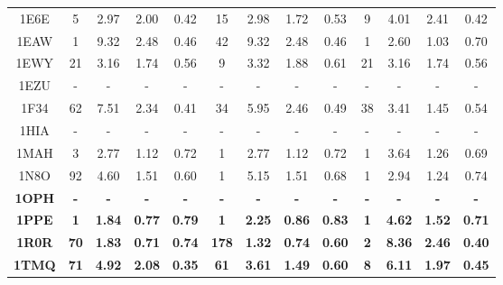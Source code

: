 \begin{longtable}{c c c c c|c c c c|c c c c}
 {\tiny 1E6E} &{\tiny 5}&{\tiny 2.97}&{\tiny 2.00}&{\tiny 0.42} &{\tiny 15}&{\tiny 2.98}&{\tiny 1.72}&{\tiny 0.53} &{\tiny 9}&{\tiny 4.01}&{\tiny 2.41}&{\tiny 0.42}\\ 
 {\tiny 1EAW} &{\tiny 1}&{\tiny 9.32}&{\tiny 2.48}&{\tiny 0.46} &{\tiny 42}&{\tiny 9.32}&{\tiny 2.48}&{\tiny 0.46} &{\tiny 1}&{\tiny 2.60}&{\tiny 1.03}&{\tiny 0.70}\\ 
 {\tiny 1EWY} &{\tiny 21}&{\tiny 3.16}&{\tiny 1.74}&{\tiny 0.56} &{\tiny 9}&{\tiny 3.32}&{\tiny 1.88}&{\tiny 0.61} &{\tiny 21}&{\tiny 3.16}&{\tiny 1.74}&{\tiny 0.56}\\ 
 {\tiny 1EZU} &{\tiny -}&{\tiny -}&{\tiny -}&{\tiny -} &{\tiny -}&{\tiny -}&{\tiny -}&{\tiny -} &{\tiny -}&{\tiny -}&{\tiny -}&{\tiny -}\\ 
 {\tiny 1F34} &{\tiny 62}&{\tiny 7.51}&{\tiny 2.34}&{\tiny 0.41} &{\tiny 34}&{\tiny 5.95}&{\tiny 2.46}&{\tiny 0.49} &{\tiny 38}&{\tiny 3.41}&{\tiny 1.45}&{\tiny 0.54}\\ 
 {\tiny 1HIA} &{\tiny -}&{\tiny -}&{\tiny -}&{\tiny -} &{\tiny -}&{\tiny -}&{\tiny -}&{\tiny -} &{\tiny -}&{\tiny -}&{\tiny -}&{\tiny -}\\ 
 {\tiny 1MAH} &{\tiny 3}&{\tiny 2.77}&{\tiny 1.12}&{\tiny 0.72} &{\tiny 1}&{\tiny 2.77}&{\tiny 1.12}&{\tiny 0.72} &{\tiny 1}&{\tiny 3.64}&{\tiny 1.26}&{\tiny 0.69}\\ 
 {\tiny 1N8O} &{\tiny 92}&{\tiny 4.60}&{\tiny 1.51}&{\tiny 0.60} &{\tiny 1}&{\tiny 5.15}&{\tiny 1.51}&{\tiny 0.68} &{\tiny 1}&{\tiny 2.94}&{\tiny 1.24}&{\tiny 0.74}\\ 
 \textbf{\tiny 1OPH} &\textbf{\tiny -}&\textbf{\tiny -}&\textbf{\tiny -}&\textbf{\tiny -} &\textbf{\tiny -}&\textbf{\tiny -}&\textbf{\tiny -}&\textbf{\tiny -} &\textbf{\tiny -}&\textbf{\tiny -}&\textbf{\tiny -}&\textbf{\tiny -}\\ 
 \textbf{\tiny 1PPE} &\textbf{\tiny 1}&\textbf{\tiny 1.84}&\textbf{\tiny 0.77}&\textbf{\tiny 0.79} &\textbf{\tiny 1}&\textbf{\tiny 2.25}&\textbf{\tiny 0.86}&\textbf{\tiny 0.83} &\textbf{\tiny 1}&\textbf{\tiny 4.62}&\textbf{\tiny 1.52}&\textbf{\tiny 0.71}\\ 
 \textbf{\tiny 1R0R} &\textbf{\tiny 70}&\textbf{\tiny 1.83}&\textbf{\tiny 0.71}&\textbf{\tiny 0.74} &\textbf{\tiny 178}&\textbf{\tiny 1.32}&\textbf{\tiny 0.74}&\textbf{\tiny 0.60} &\textbf{\tiny 2}&\textbf{\tiny 8.36}&\textbf{\tiny 2.46}&\textbf{\tiny 0.40}\\ 
 \textbf{\tiny 1TMQ} &\textbf{\tiny 71}&\textbf{\tiny 4.92}&\textbf{\tiny 2.08}&\textbf{\tiny 0.35} &\textbf{\tiny 61}&\textbf{\tiny 3.61}&\textbf{\tiny 1.49}&\textbf{\tiny 0.60} &\textbf{\tiny 8}&\textbf{\tiny 6.11}&\textbf{\tiny 1.97}&\textbf{\tiny 0.45}\\ 

\end{longtable}
